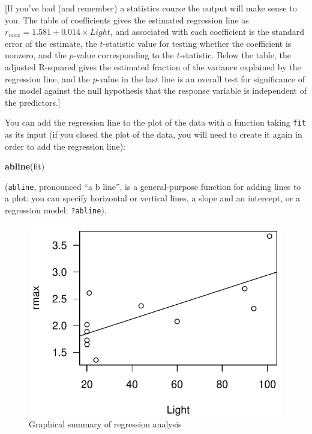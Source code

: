 \documentclass[11pt,]{article}
\newenvironment{Shaded}{\begin{snugshade}}{\end{snugshade}}
\newcommand{\KeywordTok}[1]{\textcolor[rgb]{0.13,0.29,0.53}{\textbf{#1}}}
\newcommand{\NormalTok}[1]{#1}
\begin{document}
{[}If you've had (and remember) a statistics course the output will make sense to you. The table of coefficients gives the estimated regression
line as \(r_{max} = 1.581 + 0.014 \times Light\), and associated with each coefficient is the standard error of the estimate, the \(t\)-statistic value for testing whether the coefficient is nonzero, and the \(p\)-value corresponding to the \(t\)-statistic. Below the table, the adjusted R-squared gives the estimated fraction of the variance explained by the regression line, and the \(p\)-value in the last line is an overall test for significance of the model against the null hypothesis that the response variable is independent of the predictors.{]}

You can add the regression line to the plot of the data with a function taking \texttt{fit} as its input (if you closed the plot of the data, you will need to create it again in order to add the regression line):

\begin{Shaded}
\begin{Highlighting}[]
\KeywordTok{abline}\NormalTok{(fit)}
\end{Highlighting}
\end{Shaded}

(\texttt{abline}, pronounced ``a b line'', is a general-purpose function for adding lines to a plot: you can specify horizontal or vertical lines, a slope and an intercept, or a regression model: \texttt{?abline}).

\begin{figure}
\centering
\includegraphics{Lab_1_modified_files/figure-latex/unnamed-chunk-21-1.pdf}
\caption{\label{fig:unnamed-chunk-21}Graphical summary of regression analysis}
\end{figure}
\end{document}
